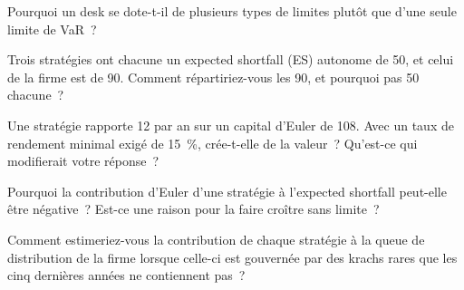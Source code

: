\begin{interviewq}\label{iq:fm:limits-and-capital-allocation:2}
Pourquoi un desk se dote-t-il de plusieurs types de limites plutôt que d'une seule limite de VaR~?
\end{interviewq}

\begin{interviewq}\label{iq:fm:limits-and-capital-allocation:3}
Trois stratégies ont chacune un expected shortfall (ES) autonome de 50, et celui de la firme est de 90. Comment répartiriez-vous les 90, et pourquoi pas 50 chacune~?
\end{interviewq}

\begin{interviewq}\label{iq:fm:limits-and-capital-allocation:4}
Une stratégie rapporte 12 par an sur un capital d'Euler de 108. Avec un taux de rendement minimal exigé de 15~\%, crée-t-elle de la valeur~? Qu'est-ce qui modifierait votre réponse~?
\end{interviewq}

\begin{interviewq}\label{iq:fm:limits-and-capital-allocation:5}
Pourquoi la contribution d'Euler d'une stratégie à l'expected shortfall peut-elle être négative~? Est-ce une raison pour la faire croître sans limite~?
\end{interviewq}

\begin{interviewq}\label{iq:fm:limits-and-capital-allocation:6}
Comment estimeriez-vous la contribution de chaque stratégie à la queue de distribution de la firme lorsque celle-ci est gouvernée par des krachs rares que les cinq dernières
années ne contiennent pas~?
\end{interviewq}
